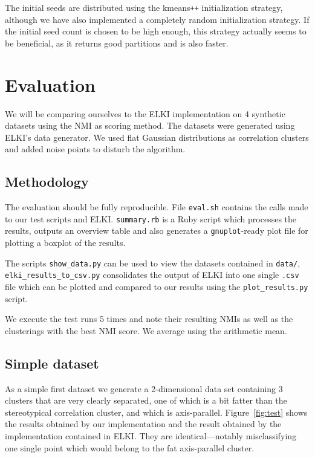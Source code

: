 \documentclass[english]{scrartcl}
\begin{document}
The initial seeds are distributed using the kmeans\texttt{++} initialization strategy,
although we have also implemented a completely random initialization strategy.
If the initial seed count is chosen to be high enough, this strategy actually
seems to be beneficial, as it returns good partitions and is also faster.


\pagebreak
\section{Evaluation}

We will be comparing ourselves to the ELKI implementation on 4 synthetic datasets
using the NMI as scoring method. The datasets were generated using ELKI's data generator.
We used flat Gaussian distributions as correlation clusters and added noise points
to disturb the algorithm.

\subsection{Methodology}

The evaluation should be fully reproducible. File \texttt{eval.sh} contains the calls made to our
test scripts and ELKI. \texttt{summary.rb} is a Ruby script which processes the results, outputs
an overview table and also generates a \texttt{gnuplot}-ready plot file for plotting a boxplot of
the results.

The scripts \texttt{show\_data.py} can be used to view the datasets contained in \texttt{data/},
\texttt{elki\_results\_to\_csv.py} consolidates the output of ELKI into one single \texttt{.csv}
file which can be plotted and compared to our results using the \texttt{plot\_results.py} script.

We execute the test runs 5 times and note their resulting NMIs as well as the clusterings with the
best NMI score. We average using the arithmetic mean.

\subsection{Simple dataset}

As a simple first dataset we generate a 2-dimensional data set containing 3 clusters that are very clearly
separated, one of which is a bit fatter than the stereotypical correlation cluster, and which is
axis-parallel. Figure~\ref{fig:test} shows the results obtained by our implementation
and the result obtained by the implementation contained in ELKI. They are identical---notably misclassifying one
single point which would belong to the fat axis-parallel cluster.
\end{document}
